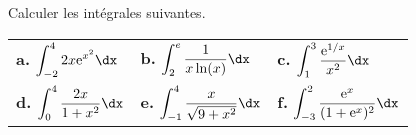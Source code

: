 \documentclass[11pt,fleqn, openany]{book} %
\begin{document}
 \begin{exercise}Calculer les intégrales suivantes.
 \renewcommand{\arraystretch}{2.5}
  \vspace{-0.5cm}
 \begin{center}
 \begin{tabularx}{\linewidth}{XXX}
 \textbf{a.} $\displaystyle\int_{-2}^4 2x\e^{x^2} \dx$ & \textbf{b.} $\displaystyle\int_{2}^{e} \dfrac{1}{x\ln(x)}\dx$ &
\textbf{c.} $\displaystyle\int_{1}^{3} \dfrac{\e^{1/x}}{x^2} \dx$ \\
\textbf{d.} $\displaystyle\int_{0}^{4} \dfrac{2x}{1+x^2} \dx$&
\textbf{e.} $\displaystyle\int_{-1}^{4} \dfrac{x}{\sqrt{9+x^2}} \dx$ & \textbf{f.} $\displaystyle\int_{-3}^2 \dfrac{\e^x}{(1+\e^x)^2}\dx$
 \end{tabularx}\end{center}\end{exercise}
 
\end{document}
